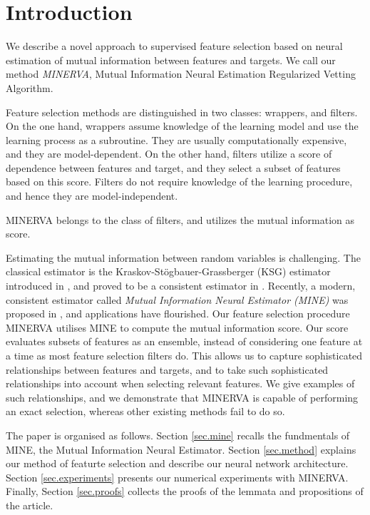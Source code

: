 \section{Introduction}
We describe 
a novel approach to supervised feature selection 
based on 
neural estimation of mutual information 
between
features 
and 
targets.
We call our method 
\emph{MINERVA},
Mutual
Information
Neural
Estimation
Regularized
Vetting
Algorithm.


Feature selection methods
are distinguished in
two classes: 
wrappers,
and
filters.
On the one hand,
wrappers
assume 
knowledge of the learning model
and use the learning process as a subroutine. 
They are usually computationally expensive,
and they are model-dependent.
On the other hand,
filters 
utilize a score of dependence between features and target,
and they select a subset of features based on this score.
Filters
do not require knowledge of the learning procedure,
and hence they are model-independent.

MINERVA belongs to the class of filters,
and utilizes the mutual information as score.

Estimating the mutual information between random variables
is challenging. 
The classical estimator is the
Kraskov-St{\"o}gbauer-Grassberger (KSG) estimator
introduced in \cite{KSG04est},
and proved to be a consistent estimator in
\cite{GOV18dem}.
Recently, 
a modern, consistent estimator 
called 
\emph{Mutual Information Neural Estimator (MINE)}
was proposed
in
\cite{BBROBCH18mut},
and applications have flourished.
Our feature selection procedure MINERVA
utilises MINE to compute the mutual information score. 
Our score
evaluates subsets of features as an ensemble,
instead of considering one feature at a time
as most feature selection filters do.
This allows us to 
capture sophisticated relationships
between features and targets,
and 
to take such sophisticated relationships
into account when selecting relevant features.
We give examples of such relationships,
and we demonstrate that
MINERVA is capable of performing an exact selection,
whereas other existing methods fail to do so.


The paper is organised as follows.
Section \ref{sec.mine}
recalls the fundmentals of MINE,
the Mutual Information Neural Estimator. 
Section \ref{sec.method}
explains our method of featurte selection 
and
describe our neural network architecture.
Section \ref{sec.experiments}
presents our numerical experiments with MINERVA.
Finally, 
Section \ref{sec.proofs}
collects the proofs of the lemmata and propositions of the article.



